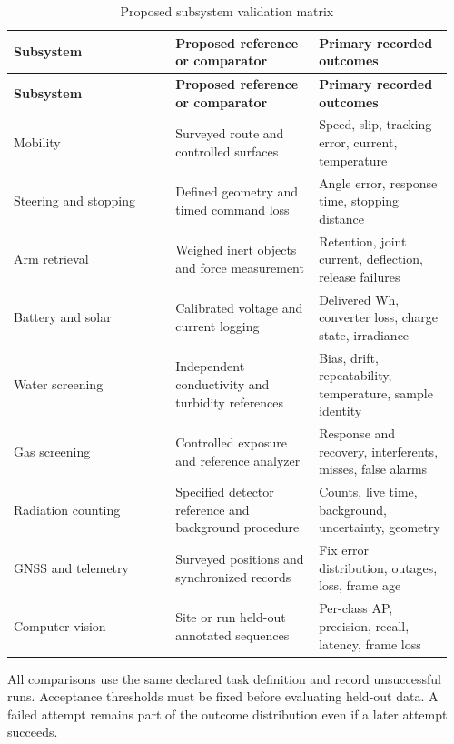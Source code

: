 \documentclass[11pt,letterpaper]{article}
\begin{document}
\begingroup
\small
\setlength{\tabcolsep}{4pt}
\renewcommand{\arraystretch}{1.14}
\begin{longtable}{@{}>{\raggedright\arraybackslash}p{0.353\linewidth}>{\raggedright\arraybackslash}p{0.316\linewidth}>{\raggedright\arraybackslash}p{0.294\linewidth}@{}}
\caption{Proposed subsystem validation matrix}\label{tab:6}\\
\toprule
\rowcolor{tablehead} \textbf{Subsystem} & \textbf{Proposed reference or comparator} & \textbf{Primary recorded outcomes} \\
\midrule
\endfirsthead
\toprule
\rowcolor{tablehead} \textbf{Subsystem} & \textbf{Proposed reference or comparator} & \textbf{Primary recorded outcomes} \\
\midrule
\endhead
\bottomrule
\endfoot
Mobility & Surveyed route and controlled surfaces & Speed, slip, tracking error, current, temperature \\[2pt]
Steering and stopping & Defined geometry and timed command loss & Angle error, response time, stopping distance \\[2pt]
Arm retrieval & Weighed inert objects and force measurement & Retention, joint current, deflection, release failures \\[2pt]
Battery and solar & Calibrated voltage and current logging & Delivered Wh, converter loss, charge state, irradiance \\[2pt]
Water screening & Independent conductivity and turbidity references & Bias, drift, repeatability, temperature, sample identity \\[2pt]
Gas screening & Controlled exposure and reference analyzer & Response and recovery, interferents, misses, false alarms \\[2pt]
Radiation counting & Specified detector reference and background procedure & Counts, live time, background, uncertainty, geometry \\[2pt]
GNSS and telemetry & Surveyed positions and synchronized records & Fix error distribution, outages, loss, frame age \\[2pt]
Computer vision & Site or run held-out annotated sequences & Per-class AP, precision, recall, latency, frame loss \\[2pt]
\end{longtable}
\endgroup

All comparisons use the same declared task definition and record unsuccessful runs. Acceptance thresholds must be fixed before evaluating held-out data. A failed attempt remains part of the outcome distribution even if a later attempt succeeds.
\end{document}
